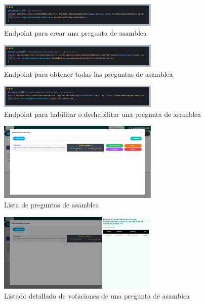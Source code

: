 \begin{figure}[H]
    \centering
    \includegraphics[width=0.7\textwidth]{resources/images/api-pregunta-crear}
    \caption{Endpoint para crear una pregunta de asamblea}
    \label{fig:api-question-create}
\end{figure}

\begin{figure}[H]
    \centering
    \includegraphics[width=0.7\textwidth]{resources/images/api-pregunta-listar-todos}
    \caption{Endpoint para obtener todas las preguntas de asamblea}
    \label{fig:api-question-all}
\end{figure}

\begin{figure}[H]
    \centering
    \includegraphics[width=0.7\textwidth]{resources/images/api-pregunta-toggle}
    \caption{Endpoint para habilitar o deshabilitar una pregunta de asamblea}
    \label{fig:api-question-toggle}
\end{figure}

\begin{figure}[H]
    \centering
    \includegraphics[width=0.7\textwidth]{resources/images/sw-asamblea-votaciones}
    \caption{Lista de preguntas de asamblea}
    \label{fig:sw-asamblea-votaciones}
\end{figure}

\begin{figure}[H]
    \centering
    \includegraphics[width=0.7\textwidth]{resources/images/sw-asamblea-votaciones-detalle}
    \caption{Listado detallado de votaciones de una pregunta de asamblea}
    \label{fig:sw-asamblea-votaciones-detail}
\end{figure}

